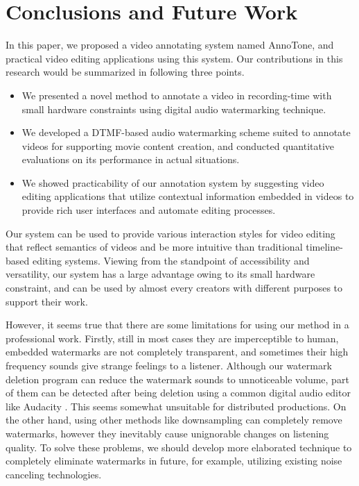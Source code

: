 \chapter{Conclusions and Future Work}

In this paper, we proposed a video annotating system named AnnoTone, and practical video editing applications using this system.
Our contributions in this research would be summarized in following three points.
\begin{itemize}
\item We presented a novel method to annotate a video in recording-time with small hardware constraints using digital audio watermarking technique.
\item We developed a DTMF-based audio watermarking scheme suited to annotate videos for supporting movie content creation, and conducted quantitative evaluations on its performance in actual situations.
\item We showed practicability of our annotation system by suggesting video editing applications that utilize contextual information embedded in videos to provide rich user interfaces and automate editing processes.
\end{itemize}
Our system can be used to provide various interaction styles for video editing that reflect semantics of videos and be more intuitive than traditional timeline-based editing systems. 
Viewing from the standpoint of accessibility and versatility, our system has a large advantage owing to its small hardware constraint, and can be used by almost every creators with different purposes to support their work.

However, it seems true that there are some limitations for using our method in a professional work.
Firstly, still in most cases they are imperceptible to human, embedded watermarks are not completely transparent, and sometimes their high frequency sounds give strange feelings to a listener.
Although our watermark deletion program can reduce the watermark sounds to unnoticeable volume, part of them can be detected after being deletion using a common digital audio editor like Audacity \cite{audacity}.
This seems somewhat unsuitable for distributed productions.
On the other hand, using other methods like downsampling can completely remove watermarks, however they inevitably cause unignorable changes on listening quality.
To solve these problems, we should develop more elaborated technique to completely eliminate watermarks in future, for example, utilizing existing noise canceling technologies.

